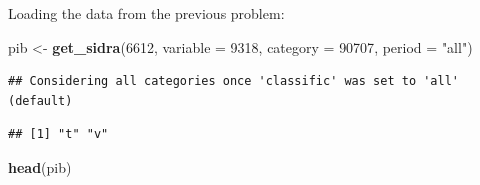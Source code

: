 \documentclass[11pt, a4paper]{report}
\newenvironment{Shaded}{\begin{snugshade}}{\end{snugshade}}
\newcommand{\DataTypeTok}[1]{\textcolor[rgb]{0.13,0.29,0.53}{#1}}
\newcommand{\DecValTok}[1]{\textcolor[rgb]{0.00,0.00,0.81}{#1}}
\newcommand{\KeywordTok}[1]{\textcolor[rgb]{0.13,0.29,0.53}{\textbf{#1}}}
\newcommand{\NormalTok}[1]{#1}
\newcommand{\OperatorTok}[1]{\textcolor[rgb]{0.81,0.36,0.00}{\textbf{#1}}}
\newcommand{\StringTok}[1]{\textcolor[rgb]{0.31,0.60,0.02}{#1}}
\theoremstyle{plain}
\theoremstyle{plain}
\theoremstyle{remark}
\begin{document}
Loading the data from the previous problem:

\begin{Shaded}
\begin{Highlighting}[]
\NormalTok{pib <-}\StringTok{ }\KeywordTok{get_sidra}\NormalTok{(}\DecValTok{6612}\NormalTok{, }\DataTypeTok{variable =} \DecValTok{9318}\NormalTok{, }\DataTypeTok{category =} \DecValTok{90707}\NormalTok{, }\DataTypeTok{period =} \StringTok{"all"}\NormalTok{)}
\end{Highlighting}
\end{Shaded}

\begin{verbatim}
## Considering all categories once 'classific' was set to 'all' (default)
\end{verbatim}

\begin{Shaded}
\end{Shaded}

\begin{verbatim}
## [1] "t" "v"
\end{verbatim}

\begin{Shaded}
\begin{Highlighting}[]
\KeywordTok{head}\NormalTok{(pib)}
\end{Highlighting}
\end{Shaded}
\end{document}
